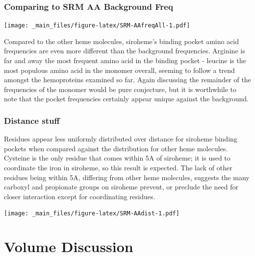 \documentclass[a4paper, nobind]{templates/ociamthesis}
\let\origfigure\figure
\let\endorigfigure\endfigure
\renewenvironment{figure}[1][2] {
    \expandafter\origfigure\expandafter[H]
} {
    \endorigfigure
}
\begin{document}
\hypertarget{comparing-to-srm-aa-background-freq}{%
\subsubsection{Comparing to SRM AA Background Freq}\label{comparing-to-srm-aa-background-freq}}

\begin{figure}
\centering
\texttt{[image: \_main\_files/figure-latex/SRM-AAfreqAll-1.pdf]}
\caption{\label{fig:SRM-AAfreqAll}SRM: AA Frequency of Monomer}
\end{figure}

Compared to the other heme molecules, siroheme's binding pocket amino acid frequencies are even more different than the background frequencies. Arginine is far and away the most frequent amino acid in the binding pocket - leucine is the most populous amino acid in the monomer overall, seeming to follow a trend amongst the hemoproteins examined so far. Again discussing the remainder of the frequencies of the monomer would be pure conjecture, but it is worthwhile to note that the pocket frequencies certainly appear unique against the background.

\hypertarget{distance-stuff}{%
\subsubsection{Distance stuff}\label{distance-stuff}}

Residues appear less uniformly distributed over distance for siroheme binding pockets when compared against the distribution for other heme molecules. Cysteine is the only residue that comes within 5A of siroheme; it is used to coordinate the iron in siroheme, so this result is expected. The lack of other residues being within 5A, differing from other heme molecules, suggests the many carboxyl and propionate groups on siroheme prevent, or preclude the need for closer interaction except for coordinating residues.

\begin{figure}
\centering
\texttt{[image: \_main\_files/figure-latex/SRM-AAdist-1.pdf]}
\caption{\label{fig:SRM-AAdist}SRM: AA Distances}
\end{figure}

\hypertarget{volume-discussion}{%
\section{Volume Discussion}\label{volume-discussion}}
\end{document}
